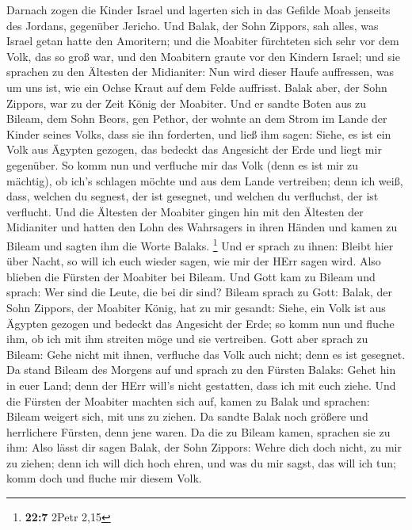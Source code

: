  Darnach zogen die Kinder Israel und lagerten sich in das
Gefilde Moab jenseits des Jordans, gegenüber Jericho.  Und
Balak, der Sohn Zippors, sah alles, was Israel getan hatte den
Amoritern;  und die Moabiter fürchteten sich sehr vor dem
Volk, das so groß war, und den Moabitern graute vor den Kindern Israel;
 und sie sprachen zu den Ältesten der Midianiter: Nun wird
dieser Haufe auffressen, was um uns ist, wie ein Ochse Kraut auf dem
Felde auffrisst. Balak aber, der Sohn Zippors, war zu der Zeit König der
Moabiter.  Und er sandte Boten aus zu Bileam, dem Sohn
Beors, gen Pethor, der wohnte an dem Strom im Lande der Kinder seines
Volks, dass sie ihn forderten, und ließ ihm sagen: Siehe, es ist ein
Volk aus Ägypten gezogen, das bedeckt das Angesicht der Erde und liegt
mir gegenüber.  So komm nun und verfluche mir das Volk
(denn es ist mir zu mächtig), ob ich's schlagen möchte und aus dem Lande
vertreiben; denn ich weiß, dass, welchen du segnest, der ist gesegnet,
und welchen du verfluchst, der ist verflucht.  Und die
Ältesten der Moabiter gingen hin mit den Ältesten der Midianiter und
hatten den Lohn des Wahrsagers in ihren Händen und kamen zu Bileam und
sagten ihm die Worte Balaks. \footnote{\textbf{22:7} 2Petr 2,15}
 Und er sprach zu ihnen: Bleibt hier über Nacht, so will
ich euch wieder sagen, wie mir der HErr sagen wird. Also blieben die
Fürsten der Moabiter bei Bileam.  Und Gott kam zu Bileam
und sprach: Wer sind die Leute, die bei dir sind?  Bileam
sprach zu Gott: Balak, der Sohn Zippors, der Moabiter König, hat zu mir
gesandt:  Siehe, ein Volk ist aus Ägypten gezogen und
bedeckt das Angesicht der Erde; so komm nun und fluche ihm, ob ich mit
ihm streiten möge und sie vertreiben.  Gott aber sprach
zu Bileam: Gehe nicht mit ihnen, verfluche das Volk auch nicht; denn es
ist gesegnet.  Da stand Bileam des Morgens auf und sprach
zu den Fürsten Balaks: Gehet hin in euer Land; denn der HErr will's
nicht gestatten, dass ich mit euch ziehe.  Und die
Fürsten der Moabiter machten sich auf, kamen zu Balak und sprachen:
Bileam weigert sich, mit uns zu ziehen.  Da sandte Balak
noch größere und herrlichere Fürsten, denn jene waren. 
Da die zu Bileam kamen, sprachen sie zu ihm: Also lässt dir sagen Balak,
der Sohn Zippors: Wehre dich doch nicht, zu mir zu ziehen;
 denn ich will dich hoch ehren, und was du mir sagst, das
will ich tun; komm doch und fluche mir diesem Volk. 

